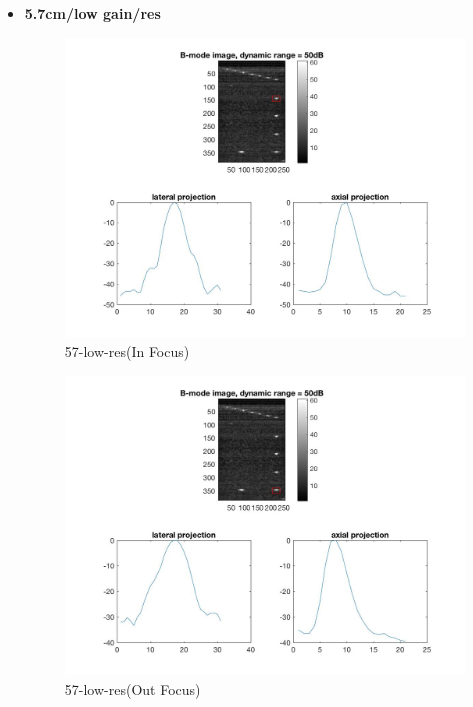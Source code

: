 \documentclass[12pts,a4paper]{article}
\begin{document}
\begin{itemize}
\pagebreak
\item{\textbf{5.7cm/low gain/res}}
\begin{center}
\end{center}
\begin{figure}[h]
    \centering
    \includegraphics[width=1.0\textwidth]{img_hw1/57-low-res1.jpg}
    \caption{57-low-res(In Focus)}
    \label{fig:mesh1}
\end{figure}
\pagebreak
\begin{figure}[h]
    \centering
    \includegraphics[width=1.0\textwidth]{img_hw1/57-low-res2.jpg}
    \caption{57-low-res(Out Focus)}
    \label{fig:mesh1}
\end{figure}

\end{itemize}
\end{document}

